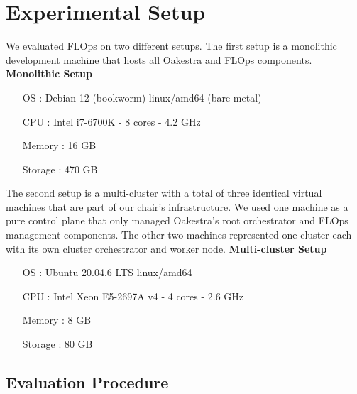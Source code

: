 \section{Experimental Setup}
We evaluated FLOps on two different setups.
The first setup is a monolithic development machine that hosts all Oakestra and FLOps components.
\vspace{5mm}
\newline
\textbf{Monolithic Setup}
\begin{itemize}
    \item [OS]: Debian 12 (bookworm) linux/amd64 (bare metal)
    \item [CPU]: Intel i7-6700K - 8 cores - 4.2 GHz
    \item [Memory]: 16 GB
    \item [Storage]: 470 GB
\end{itemize}

The second setup is a multi-cluster with a total of three identical virtual machines that are part of our chair's infrastructure.
We used one machine as a pure control plane that only managed Oakestra's root orchestrator and FLOps management components.
The other two machines represented one cluster each with its own cluster orchestrator and worker node.
\vspace{5mm}
\newline
\textbf{Multi-cluster Setup}
\begin{itemize}
    \item [OS]: Ubuntu 20.04.6 LTS linux/amd64
    \item [CPU]: Intel Xeon E5-2697A v4 - 4 cores - 2.6 GHz 
    \item [Memory]: 8 GB
    \item [Storage]: 80 GB
\end{itemize}

\subsection{Evaluation Procedure}

